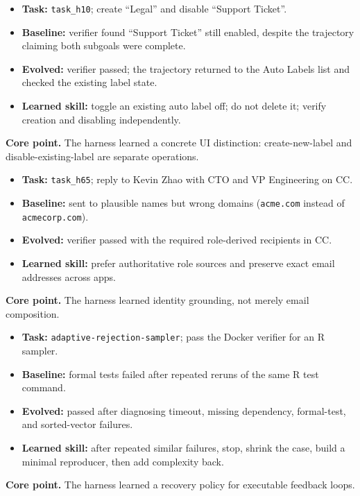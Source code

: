 \begin{tcolorbox}[evoCase, colback=blue!2, colframe=blue!45,
title={WebArena: verified setting}]
\small
\begin{itemize}[leftmargin=1.1em, itemsep=1pt, topsep=1pt]
\item \textbf{Task:} \texttt{task\_h10}; create ``Legal'' and disable
``Support Ticket''.
\item \textbf{Baseline:} verifier found ``Support Ticket'' still enabled,
despite the trajectory claiming both subgoals were complete.
\item \textbf{Evolved:} verifier passed; the trajectory returned to the Auto
Labels list and checked the existing label state.
\item \textbf{Learned skill:} toggle an existing auto label off; do not delete
it; verify creation and disabling independently.
\end{itemize}
\tcblower
\textbf{Core point.} The harness learned a concrete UI distinction:
create-new-label and disable-existing-label are separate operations.
\end{tcolorbox}

\begin{tcolorbox}[evoCase, colback=blue!2, colframe=blue!45,
title={WebArena: grounded recipients}]
\small
\begin{itemize}[leftmargin=1.1em, itemsep=1pt, topsep=1pt]
\item \textbf{Task:} \texttt{task\_h65}; reply to Kevin Zhao with CTO and VP
Engineering on CC.
\item \textbf{Baseline:} sent to plausible names but wrong domains
(\texttt{acme.com} instead of \texttt{acmecorp.com}).
\item \textbf{Evolved:} verifier passed with the required role-derived
recipients in CC.
\item \textbf{Learned skill:} prefer authoritative role sources and preserve
exact email addresses across apps.
\end{itemize}
\tcblower
\textbf{Core point.} The harness learned identity grounding, not merely email
composition.
\end{tcolorbox}

\begin{tcolorbox}[evoCase, colback=orange!2, colframe=orange!45,
title={Terminal-Bench: executable recovery}]
\small
\begin{itemize}[leftmargin=1.1em, itemsep=1pt, topsep=1pt]
\item \textbf{Task:} \texttt{adaptive-rejection-sampler}; pass the Docker
verifier for an R sampler.
\item \textbf{Baseline:} formal tests failed after repeated reruns of the same
R test command.
\item \textbf{Evolved:} passed after diagnosing timeout, missing dependency,
formal-test, and sorted-vector failures.
\item \textbf{Learned skill:} after repeated similar failures, stop, shrink the
case, build a minimal reproducer, then add complexity back.
\end{itemize}
\tcblower
\textbf{Core point.} The harness learned a recovery policy for executable
feedback loops.
\end{tcolorbox}

